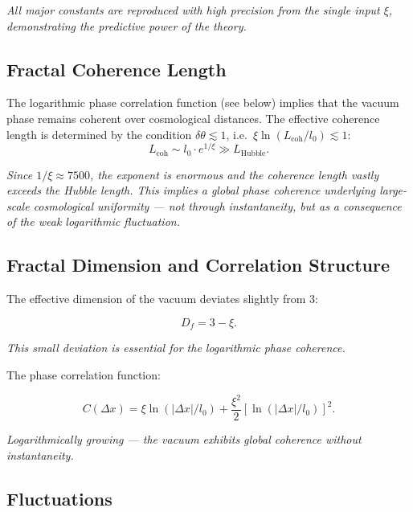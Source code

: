 	\textit{All major constants are reproduced with high precision from the single input \(\xi\), demonstrating the predictive power of the theory.}
	
	\subsection*{Fractal Coherence Length}
	
	The logarithmic phase correlation function (see below) implies that the vacuum phase remains coherent over cosmological distances. The effective coherence length is determined by the condition \(\delta\theta \lesssim 1\), i.e.\ \(\xi \ln(L_{\text{coh}}/l_0) \lesssim 1\):
	\begin{equation}
		L_{\text{coh}} \sim l_0 \cdot e^{1/\xi} \gg L_{\text{Hubble}}.
	\end{equation}
	
	\textit{Since \(1/\xi \approx 7500\), the exponent is enormous and the coherence length vastly exceeds the Hubble length. This implies a global phase coherence underlying large-scale cosmological uniformity — not through instantaneity, but as a consequence of the weak logarithmic fluctuation.}
	
	\subsection*{Fractal Dimension and Correlation Structure}
	
	The effective dimension of the vacuum deviates slightly from 3:
	
	\begin{equation}
		D_f = 3 - \xi.
	\end{equation}
	
	\textit{This small deviation is essential for the logarithmic phase coherence.}
	
	The phase correlation function:
	
	\begin{equation}
		C(\Delta x) = \xi \ln(|\Delta x|/l_0) + \frac{\xi^2}{2} [\ln(|\Delta x|/l_0)]^2.
	\end{equation}
	
	\textit{Logarithmically growing — the vacuum exhibits global coherence without instantaneity.}
	
	\subsection*{Fluctuations}
	
